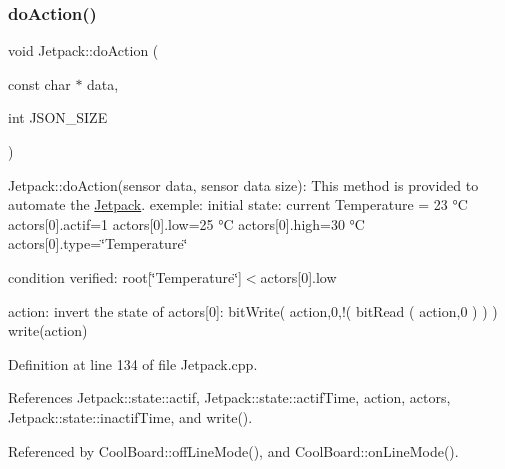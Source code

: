 \subsubsection{\texorpdfstring{do\+Action()}{doAction()}}
{\footnotesize\ttfamily void Jetpack\+::do\+Action (\begin{DoxyParamCaption}\item[{const char $\ast$}]{data,  }\item[{int}]{J\+S\+O\+N\+\_\+\+S\+I\+ZE }\end{DoxyParamCaption})}

Jetpack\+::do\+Action(sensor data, sensor data size)\+: This method is provided to automate the \hyperlink{classJetpack}{Jetpack}. exemple\+: initial state\+: current Temperature = 23 °C actors\mbox{[}0\mbox{]}.actif=1 actors\mbox{[}0\mbox{]}.low=25 °C actors\mbox{[}0\mbox{]}.high=30 °C actors\mbox{[}0\mbox{]}.type=\char`\"{}\+Temperature\char`\"{}

condition verified\+: root\mbox{[}\char`\"{}\+Temperature\char`\"{}\mbox{]}$<$actors\mbox{[}0\mbox{]}.low

action\+: invert the state of actors\mbox{[}0\mbox{]}\+: bit\+Write( action,0,!( bit\+Read ( action,0 ) ) ) write(action) 

Definition at line 134 of file Jetpack.\+cpp.



References Jetpack\+::state\+::actif, Jetpack\+::state\+::actif\+Time, action, actors, Jetpack\+::state\+::inactif\+Time, and write().



Referenced by Cool\+Board\+::off\+Line\+Mode(), and Cool\+Board\+::on\+Line\+Mode().


